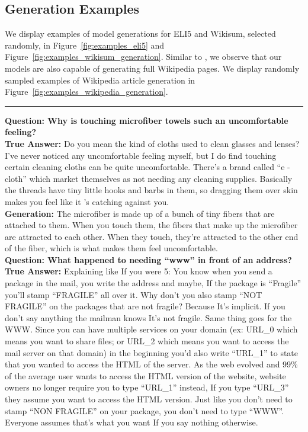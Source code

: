\documentclass[11pt,a4paper]{article}
\begin{document}
\subsection{Generation Examples}

We display examples of model generations for ELI5 and Wikisum, selected randomly, in Figure~\ref{fig:examples_eli5} and Figure~\ref{fig:examples_wikisum_generation}. Similar to \cite{liu2018generating}, we observe that our models are also capable of generating full Wikipedia pages. We display randomly sampled examples of  Wikipedia article generation in Figure~\ref{fig:examples_wikipedia_generation}.

\begin{figure*}[t]
  \small
  \rule{\linewidth}{1pt}
    \noindent \textbf{Question: Why is touching microfiber towels such an uncomfortable feeling?}\\  
    
    \textbf{True Answer:} Do you mean the kind of cloths used to clean glasses and lenses? I've never noticed any uncomfortable feeling myself, but I do find touching certain cleaning cloths can be quite uncomfortable. There's a brand called ``e - cloth'' which market themselves as not needing any cleaning supplies. Basically the threads have tiny little hooks and barbs in them, so dragging them over skin makes you feel like it 's catching against you.\\
    
    \textbf{Generation:} The microfiber is made up of a bunch of tiny fibers that are attached to them. When you touch them, the fibers that make up the microfiber are attracted to each other. When they touch, they're attracted to the other end of the fiber, which is what makes them feel uncomfortable.  \\  

    \vspace{2mm} \textbf{Question: What happened to needing ``www'' in front of an address?} \\ 
    
    \textbf{True Answer:} Explaining like If you were 5: You know when you send a package in the mail, you write the address and maybe, If the package is ``Fragile'' you'll stamp ``FRAGILE'' all over it. Why don't you also stamp ``NOT FRAGILE'' on the packages that are not fragile? Because It's implicit. If you don't say anything the mailman knows It's not fragile. Same thing goes for the WWW. Since you can have multiple services on your domain (ex: URL\_0 which means you want to share files; or URL\_2 which means you want to access the mail server on that domain) in the beginning you'd also write ``URL\_1'' to state that you wanted to access the HTML of the server. As the web evolved and 99\% of the average user wants to access the HTML version of the website, website owners no longer require you to type ``URL\_1'' instead, If you type ``URL\_3'' they assume you want to access the HTML version. Just like you don't need to stamp ``NON FRAGILE'' on your package, you don't need to type ``WWW''. Everyone assumes that's what you want If you say nothing otherwise.\\
    

\end{figure*}
\end{document}
